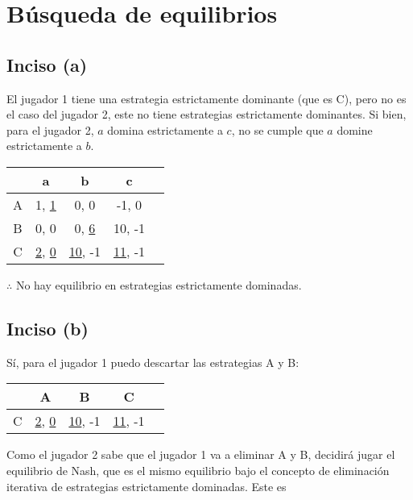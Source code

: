 \documentclass{article}
\newcommand{\ulcolor}[2][Red]{\setulcolor{#1}\ul{#2}}
\begin{document}
    \section{Búsqueda de equilibrios}
        \subsection*{Inciso (a)}
            El jugador 1 tiene una estrategia estrictamente dominante (que es C), pero no es el caso del jugador 2, este no tiene estrategias estrictamente dominantes. Si bien, para el jugador 2, $a$ domina estrictamente a $c$, no se cumple que $a$ domine estrictamente a $b$.
            \begin{table}[H]
                \begin{tabular}{|c|c|c|c|c|}
                    \hline
                        & a & b & c \\ \hline
                    A & 1, \ulcolor[blue]{1} & 0, 0 & -1, 0 \\ 
                    B & 0, 0 & 0, \ulcolor[blue]{6} & 10, -1 \\
                    C & \ulcolor[red]{2}, \ulcolor[blue]{0} & \ulcolor[red]{10}, -1 & \ulcolor[red]{11}, -1 \\ \hline
                \end{tabular}
            \end{table}
            $\therefore$ No hay equilibrio en estrategias estrictamente dominadas.
        \subsection*{Inciso (b)}
            Sí, para el jugador 1 puedo descartar las estrategias A y B:
            \begin{table}[H]
                \begin{tabular}{|c|c|c|c|c|}
                    \hline
                        & A & B & C \\ \hline
                    C & \ulcolor[red]{2}, \ulcolor[blue]{0} & \ulcolor[red]{10}, -1 & \ulcolor[red]{11}, -1 \\ \hline
                \end{tabular}
            \end{table}
            Como el jugador 2 sabe que el jugador 1 va a eliminar A y B, decidirá jugar el equilibrio de Nash, que es el mismo equilibrio bajo el concepto de eliminación iterativa de estrategias estrictamente dominadas. Este es 
        
\end{document}
